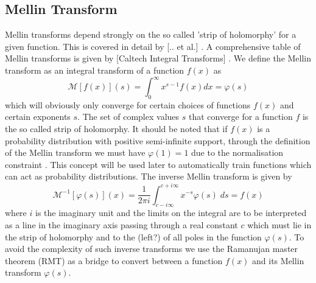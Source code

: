 \documentclass[journal=jcisd8,manuscript=article,layout=onecolumn,pdftex,floatfix,amsmath,amssymb,10pt]{achemso}
\begin{document}
\subsection{Mellin Transform}
Mellin transforms depend strongly on the so called 'strip of holomorphy' for a given function. This is covered in detail by [{\color{red}.. et al.}] \cite{Geerens}. A comprehensive table of Mellin transforms is given by [Caltech Integral Transforms] \cite{}. We define the Mellin transform as an integral transform of a function $f(x)$ as
\begin{equation}
\mathcal{M}[f(x)](s) = \int_0^\infty x^{s-1}f(x) dx = \varphi(s)
\end{equation}
which will obviously only converge for certain choices of functions $f(x)$ and certain exponents $s$. The set of complex values $s$ that converge for a function $f$ is the so called strip of holomorphy. It should be noted that if $f(x)$ is a probability distribution with positive semi-infinite support, through the definition of the Mellin transform we must have $\varphi(1)=1$ due to the normalisation constraint \cite{Geerens}. This concept will be used later to automatically train functions which can act as probability distributions. The inverse Mellin transform is given by
\begin{equation}
\mathcal{M}^{-1}[\varphi(s)](x) = \frac{1}{2 \pi i}\int_{c- i \infty}^{c + i \infty} x^{-s} \varphi(s) \; ds = f(x)
\label{eqn:InverseMT}
\end{equation}
where $i$ is the imaginary unit and the limits on the integral are to be interpreted as a line in the imaginary axis passing through a real constant $c$ which must lie in the strip of holomorphy and to the {\color{red}(left?)} of all poles in the function $\varphi(s)$. To avoid the complexity of such inverse transforms we use the Ramanujan master theorem (RMT) as a bridge to convert between a function $f(x)$ and its Mellin transform $\varphi(s)$.
\end{document}
